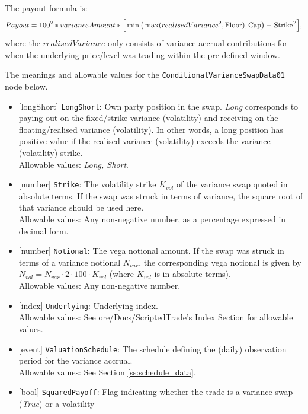 The payout formula is:
\begin{equation*}
  Payout = 100^2 * varianceAmount * \Big[ \min \big( \max (realisedVariance^2, \text{\lstinline!Floor!}), \text{\lstinline!Cap!}\big) - \text{\lstinline!Strike!}^2 \Big],
\end{equation*}
where the $realisedVariance$ only consists of variance accrual contributions for when the underlying price/level
was trading within the pre-defined window.

The meanings and allowable values for the \lstinline!ConditionalVarianceSwapData01! node below.

\begin{itemize}
  \item{}[longShort] \lstinline!LongShort!: Own party position in the swap. \emph{Long} corresponds to paying out on the
  fixed/strike variance (volatility) and receiving on the floating/realised variance (volatility). In other words,
  a long position has positive value if the realised variance (volatility) exceeds the variance (volatility)
  strike. \\
  Allowable values: \emph{Long, Short}.
  \item{}[number] \lstinline!Strike!: The volatility strike $K_{vol}$ of the variance swap quoted in absolute terms.
  If the swap was struck in terms of variance, the square root of that variance should be used here. \\
  Allowable values: Any non-negative number, as a percentage expressed in decimal form.
  \item{}[number] \lstinline!Notional!: The vega notional amount. If the swap was struck in terms of a variance notional
  $N_{var}$, the corresponding vega notional is given by $N_{vol} = N_{var} \cdot 2 \cdot 100 \cdot K_{vol}$ (where
  $K_{vol}$ is in absolute terms). \\
  Allowable values: Any non-negative number.
  \item{}[index] \lstinline!Underlying!: Underlying index. \\
  Allowable values: See ore/Docs/ScriptedTrade's Index Section for allowable values.
  \item{}[event] \lstinline!ValuationSchedule!: The schedule defining the (daily) observation period for the variance accrual. \\
  Allowable values: See Section \ref{ss:schedule_data}.
  \item{}[bool] \lstinline!SquaredPayoff!: Flag indicating whether the trade is a variance swap (\emph{True}) or a volatility

\end{itemize}
